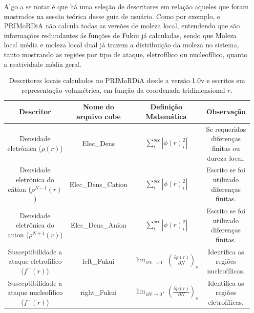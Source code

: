 \documentclass[a4paper,11pt]{refart}
\begin{document}
Algo a se notar é que há uma seleção de descritores em relação aqueles que foram mostrados na sessão teórica desse guia de usuário. Como por exemplo, o PRIMoRDiA não calcula todas as versões de moleza local, entendendo que são informações redundantes ás funções de Fukui já calculadas, sendo que Moleza local média e moleza local dual já trazem a distribuição da moleza no sistema, tanto mostrando as regiões por tipo de ataque, eletrofílico ou nucleofílico, quanto a reatividade média geral.  

\hspace*{-\leftmarginwidth}
\begin{minipage}{\fullwidth}
	\begin{table}[H]
		\centering	
		\caption{Descritores locais calculados no PRIMoRDiA desde a versão 1.0v e escritos em representação volumétrica, em função da coordenada tridimensional $r$.}
		\begin{tabular}{c|c|c|c}
			\toprule
			Descritor &\makecell{Nome do\\ arquivo cube}&\makecell{Definição\\Matemática}&Observação \\
			\midrule
			\makecell{Densidade \\eletrônica ($\rho(r)$)} &Elec\_Dens &$\sum_{i}^{occ} |\phi(r)^2_i|$ & \makecell{Se requeridos diferenças\\ finitas ou dureza local.} \\\hline
			\makecell{Densidade \\eletrônica do \\cátion ($\rho^{N-1}(r)$)} &Elec\_Dens\_Cation &$\sum_{i}^{occ} |\phi(r)^2_i|$ & \makecell{Escrito se foi utilizado\\ diferenças finitas.} \\\hline			
			\makecell{Densidade \\eletrônica do\\ anion ($\rho^{N+1}(r)$)} &Elec\_Dens\_Anion&$\sum_{i}^{occ} |\phi(r)^2_i|$ &   \makecell{Escrito se foi utilizado\\ diferenças finitas.} \\\hline
			\makecell{Susceptibilidade \\a ataque eletrofílico\\ ($f^-(r)$)} &left\_Fukui&$\lim_{\partial N \to 0^-}\left(\frac{\partial  \rho(r)}{\partial N} \right)_\nu$ &  \makecell{Identifica as regiões\\ nucleofílicas.} \\  \hline	
			\makecell{Susceptibilidade \\a ataque nucleofílico\\ ($f^+(r)$)}&right\_Fukui&$\lim_{\partial N \to 0^+}\left(\frac{\partial  \rho(r)}{\partial N} \right)_\nu$  & \makecell{Identifica as regiões\\ eletrofílicas.}   \\ \hline	

\end{tabular}
\end{table}
\end{minipage}
\end{document}
